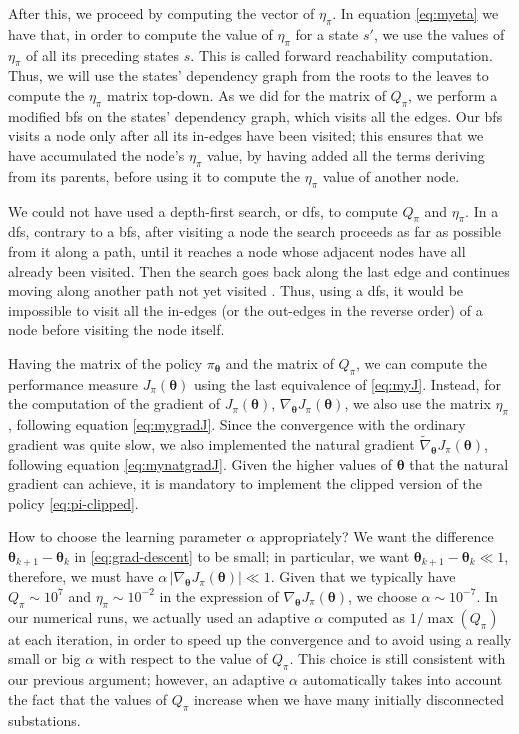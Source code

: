 After this, we proceed by computing the vector of $\eta_\pi$. In equation \eqref{eq:myeta} we have that, in order to compute the value of $\eta_\pi$ for a state $s'$, we use the values of $\eta_\pi$ of all its preceding states $s$. This is called forward reachability computation. Thus, we will use the states' dependency graph from the roots to the leaves to compute the $\eta_\pi$ matrix top-down. As we did for the matrix of $Q_\pi$, we perform a modified \acrshort{bfs} on the states' dependency graph, which visits all the edges. Our \acrshort{bfs} visits a node only after all its in-edges have been visited; this ensures that we have accumulated the node's $\eta_\pi$ value, by having added all the terms deriving from its parents, before using it to compute the $\eta_\pi$ value of another node.

We could not have used a depth-first search, or \acrshort{dfs}, to compute $Q_\pi$ and $\eta_\pi$. In a \acrshort{dfs}, contrary to a \acrshort{bfs}, after visiting a node the search proceeds as far as possible from it along a path, until it reaches a node whose adjacent nodes have all already been visited. Then the search goes back along the last edge and continues moving along another path not yet visited \cite{Montresor2014}. Thus, using a \acrshort{dfs}, it would be impossible to visit all the in-edges (or the out-edges in the reverse order) of a node before visiting the node itself.

Having the matrix of the policy $\pi_{\boldsymbol \theta}$ and the matrix of $Q_\pi$, we can compute the performance measure $J_\pi (\boldsymbol \theta)$ using the last equivalence of \eqref{eq:myJ}. Instead, for the computation of the gradient of $J_\pi (\boldsymbol \theta)$, $\nabla_{\boldsymbol \theta} J_\pi (\boldsymbol \theta)$, we also use the matrix $\eta_\pi$, following equation \eqref{eq:mygradJ}. Since the convergence with the ordinary gradient was quite slow, we also implemented the natural gradient $\widetilde \nabla_{\boldsymbol \theta} J_\pi (\boldsymbol \theta)$, following equation \eqref{eq:mynatgradJ}. Given the higher values of $\boldsymbol \theta$ that the natural gradient can achieve, it is mandatory to implement the clipped version of the policy \eqref{eq:pi-clipped}.

How to choose the learning parameter $\alpha$ appropriately? We want the difference $\boldsymbol \theta_{k+1} - \boldsymbol \theta_k$ in \eqref{eq:grad-descent} to be small; in particular, we want $\boldsymbol \theta_{k+1} - \boldsymbol \theta_k \ll 1$, therefore, we must have $\alpha \, |\nabla_{\boldsymbol \theta} J_\pi (\boldsymbol \theta)| \ll 1$. Given that we typically have $Q_\pi \sim 10^7$ and $\eta_\pi \sim 10^{-2}$ in the expression of $\nabla_{\boldsymbol \theta} J_\pi (\boldsymbol \theta)$, we choose $\alpha \sim 10^{-7}$. In our numerical runs, we actually used an adaptive $\alpha$ computed as $1 / \max(Q_\pi)$ at each iteration, in order to speed up the convergence and to avoid using a really small or big $\alpha$ with respect to the value of $Q_\pi$. This choice is still consistent with our previous argument; however, an adaptive $\alpha$ automatically takes into account the fact that the values of $Q_\pi$ increase when we have many initially disconnected substations.

